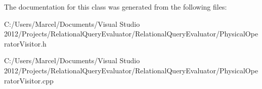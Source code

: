 The documentation for this class was generated from the following files\+:\begin{DoxyCompactItemize}
\item 
C\+:/\+Users/\+Marcel/\+Documents/\+Visual Studio 2012/\+Projects/\+Relational\+Query\+Evaluator/\+Relational\+Query\+Evaluator/Physical\+Operator\+Visitor.\+h\item 
C\+:/\+Users/\+Marcel/\+Documents/\+Visual Studio 2012/\+Projects/\+Relational\+Query\+Evaluator/\+Relational\+Query\+Evaluator/Physical\+Operator\+Visitor.\+cpp\end{DoxyCompactItemize}
